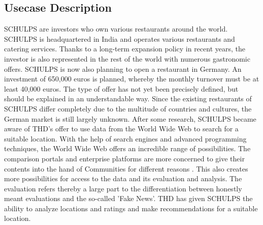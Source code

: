 \subsection{Usecase Description}
\label{subsec:usecase}
SCHULPS are investors who own various restaurants around the world. SCHULPS is headquartered in India and operates various restaurants and catering services. Thanks to a long-term expansion policy in recent years, the investor is also represented in the rest of the world with numerous gastronomic offers. SCHULPS is now also planning to open a restaurant in Germany. An investment of 650,000 euros is planned, whereby the monthly turnover must be at least 40,000 euros. The type of offer has not yet been precisely defined, but should be explained in an understandable way. Since the existing restaurants of SCHULPS differ completely due to the multitude of countries and cultures, the German market is still largely unknown. After some research, SCHULPS became aware of THD's offer to use data from the World Wide Web to search for a suitable location. With the help of search engines and advanced programming techniques, the World Wide Web offers an incredible range of possibilities. The comparison portals and enterprise platforms are more concerned to give their contents into the hand of Communities for different reasons \cite{SocialBusiness}. This also creates more possibilities for access to the data and its evaluation and analysis. The evaluation refers thereby a large part to the differentiation between honestly meant evaluations and the so-called 'Fake News'.
THD has given SCHULPS the ability to analyze locations and ratings and make recommendations for a suitable location.
